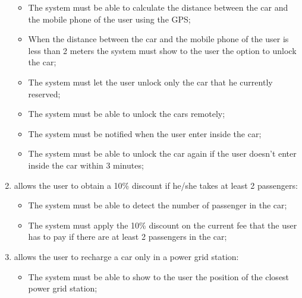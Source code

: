 \begin{enumerate}
\begin{itemize}
\item The system must be able to calculate the distance between the car and the mobile phone of the user using the GPS;
\item When the distance between the car and the mobile phone of the user is less than 2 meters the system must show to the user the option to unlock the car;
\item The system must let the user unlock only the car that he currently reserved;
\item The system must be able to unlock the cars remotely;
\item The system must be notified when the user enter inside the car;
\item The system must be able to unlock the car again if the user doesn't enter inside the car within 3 minutes;
\end{itemize}

\item allows the user to obtain a 10\% discount if he/she takes at least 2 passengers:

\begin{itemize}
\item The system must be able to detect the number of passenger in the car;
\item The system must apply the 10\% discount on the current fee that the user has to pay if there are at least 2 passengers in the car;
\end{itemize}

\item allows the user to recharge a car only in a power grid station:

\begin{itemize}
\item The system must be able to show to the user the position of the closest power grid station;
\end{itemize}

\end{enumerate}

